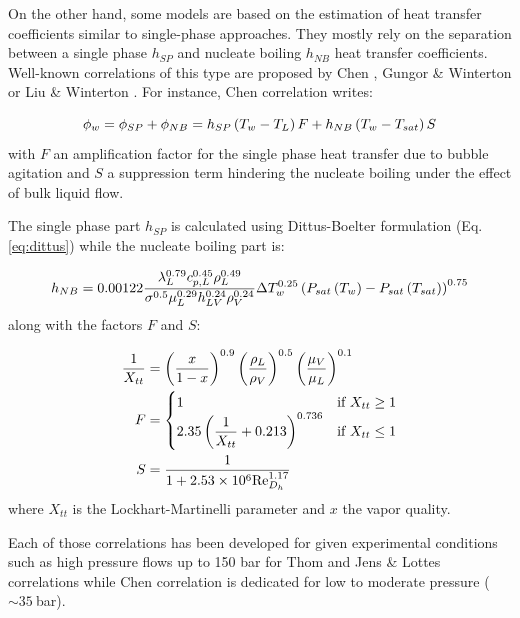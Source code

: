 \npar

On the other hand, some models are based on the estimation of heat transfer coefficients similar to single-phase approaches. They mostly rely on the separation between a single phase $h_{SP}$ and nucleate boiling $h_{NB}$ heat transfer coefficients. Well-known correlations of this type are proposed by Chen \cite{chen_correlation_1966}, Gungor \& Winterton \cite{gungor_general_1986} or Liu \& Winterton \cite{liu_general_1991}. For instance, Chen correlation writes:

\begin{equation}
\phi_{w} = \phi_{SP} + \phi_{NB} = h_{SP}\left( T_{w}-T_{L} \right)F + h_{NB}\left( T_{w}-T_{sat} \right)S
\end{equation}
with $F$ an amplification factor for the single phase heat transfer due to bubble agitation and $S$ a suppression term hindering the nucleate boiling under the effect of bulk liquid flow.

\npar
The single phase part $h_{SP}$ is calculated using Dittus-Boelter \cite{dittus_heat_1985} formulation (Eq. \ref{eq:dittus}) while the nucleate boiling part is:

\begin{equation}
h_{NB} = 0.00122 \frac{\lambda_{L}^{0.79} c_{p,L}^{0.45} \rho_{L}^{0.49}}{\sigma^{0.5} \mu_{L}^{0.29} h_{LV}^{0.24}\rho_{V}^{0.24}} \Delta T_{w}^{0.25} \left( P_{sat}\left( T_{w} \right) - P_{sat}\left( T_{sat} \right) \right)^{0.75}
\end{equation}
along with the factors $F$ and $S$:

\begin{align}
\frac{1}{X_{tt}} & = \parth{\frac{x}{1-x}}^{0.9} \parth{\frac{\rho_{L}}{\rho_{V}}}^{0.5} \parth{\frac{\mu_{V}}{\mu_{L}}}^{0.1} \\
F &= 
\begin{cases}
1\ &\text{if}\ X_{tt}\geq 1\\
2.35 \parth{\dfrac{1}{X_{tt}} + 0.213}^{0.736} &\text{if}\ X_{tt}\leq 1
\end{cases}
\\
%
S &= \dfrac{1}{1+ 2.53\times 10^{6} \Re_{D_{h}}^{1.17}}
\end{align}
where $X_{tt}$ is the Lockhart-Martinelli parameter \cite{lockhart_proposed_nodate} and $x$ the vapor quality.

\npar

Each of those correlations has been developed for given experimental conditions such as high pressure flows up to 150 bar for Thom and Jens \& Lottes correlations while Chen correlation is dedicated for low to moderate pressure ($\sim 35\ $bar).

